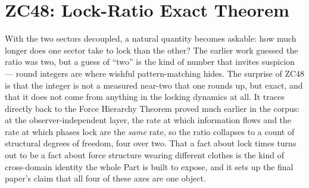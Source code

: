 \documentclass[12pt, a4paper]{article}
\begin{document}
\newpage

\section{ZC48: Lock-Ratio Exact Theorem}
\label{sec:zc48}

With the two sectors decoupled, a natural quantity becomes askable: how much
longer does one sector take to lock than the other? The earlier work guessed the
ratio was two, but a guess of ``two'' is the kind of number that invites
suspicion --- round integers are where wishful pattern-matching hides. The
surprise of ZC48 is that the integer is not a measured near-two that one rounds
up, but exact, and that it does not come from anything in the locking dynamics
at all. It traces directly back to the Force Hierarchy Theorem proved much
earlier in the corpus: at the observer-independent layer, the rate at which
information flows and the rate at which phases lock are the \emph{same} rate, so
the ratio collapses to a count of structural degrees of freedom, four over two.
That a fact about lock times turns out to be a fact about force structure
wearing different clothes is the kind of cross-domain identity the whole Part is
built to expose, and it sets up the final paper's claim that all four of these
axes are one object.
\end{document}
